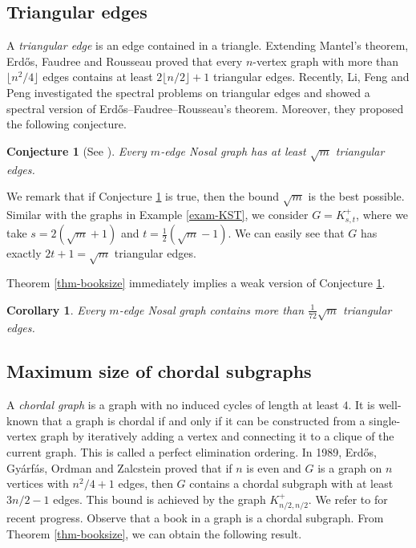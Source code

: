 \documentclass[11pt,a4paper]{article}
\newtheorem{cor}[theorem]{Corollary}
\newtheorem{conj}[theorem]{Conjecture}
\theoremstyle{definition}
\theoremstyle{remark}
\begin{document}
\subsection{Triangular edges}
A \emph{triangular edge} is an edge contained in a triangle. Extending Mantel's theorem, 
Erd\H{o}s, Faudree and Rousseau \cite{EFR1992} proved that 
every $n$-vertex graph with more than 
$\lfloor n^2/ 4\rfloor$ edges contains at least 
$2\lfloor n/2\rfloor +1$ triangular edges. 
Recently, Li, Feng and Peng \cite{LFP2024-triangular} investigated the spectral problems on triangular edges and showed a spectral version of 
Erd\H{o}s--Faudree--Rousseau's theorem. 
Moreover, they proposed the following conjecture. 


\begin{conj}[See \cite{LFP2024-triangular}] 
\label{thm-main2} 
Every $m$-edge Nosal graph has at least $\sqrt{m}$ triangular edges. 
\end{conj}
 

We remark that if Conjecture \ref{thm-main2} is true, 
then the bound $\sqrt{m}$ is the best possible. 
Similar with the graphs in Example \ref{exam-KST}, 
we consider $G=K_{s,t}^+$, where we take $s=2(\sqrt{m} +1)$ and $t=\frac{1}{2}(\sqrt{m} -1)$. 
We can easily see that $G$ has exactly $2t+1=\sqrt{m}$ triangular edges. 

Theorem \ref{thm-booksize} immediately implies a weak version of Conjecture \ref{thm-main2}.

\begin{cor}
Every $m$-edge Nosal graph contains more than $\frac{1}{72}\sqrt{m}$ 
triangular edges. 
\end{cor} 


\subsection{Maximum size of chordal subgraphs}

A \emph{chordal graph} is a graph with no induced cycles of length at least $4$. It is well-known that a graph is chordal if and only if 
it can be constructed from a single-vertex graph by 
iteratively adding a vertex and connecting it to a clique of 
the current graph. This is called a perfect elimination ordering. 
In 1989, 
Erd\H{o}s, Gy\'{a}rf\'{a}s, Ordman and Zalcstein \cite{EGOZ1989} proved that 
if $n$ is even and $G$ is a graph on $n$ vertices with 
$n^2/4 +1$ edges, then $G$ contains a chordal subgraph with at least  $3n/2 -1$ edges. 
This bound is achieved by the graph $K_{n/2,n/2}^+$. 
We refer to \cite{GS2023} for recent progress. 
Observe that a book in a graph is a chordal subgraph.  
From Theorem \ref{thm-booksize}, we can obtain the following result. 
\end{document}
